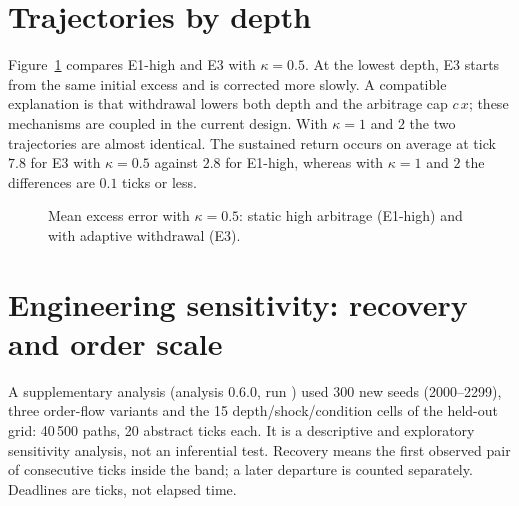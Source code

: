 \section{Trajectories by depth}

Figure~\ref{fig:prof} compares E1-high and E3 with $\kappa=0.5$. At the lowest depth, E3 starts from the same initial excess and is corrected more slowly. A compatible explanation is that withdrawal lowers both depth and the arbitrage cap $c\,x$; these mechanisms are coupled in the current design. With $\kappa=1$ and $2$ the two trajectories are almost identical. The sustained return occurs on average at tick $7.8$ for E3 with $\kappa=0.5$ against $2.8$ for E1-high, whereas with $\kappa=1$ and $2$ the differences are $0.1$ ticks or less.

\begin{figure}[htbp]
\centering
{}
\caption{Mean excess error with $\kappa=0.5$: static high arbitrage (E1-high) and with adaptive withdrawal (E3).}
\label{fig:prof}
\end{figure}

\section{Engineering sensitivity: recovery and order scale}
\label{sec:engineering-sensitivity}

A supplementary analysis (analysis 0.6.0, run \code{\EngineeringRunID}) used 300 new seeds (2000--2299), three order-flow variants and the 15 depth/shock/condition cells of the held-out grid: 40\,500 paths, 20 abstract ticks each. It is a descriptive and exploratory sensitivity analysis, not an inferential test. Recovery means the first observed pair of consecutive ticks inside the band; a later departure is counted separately. Deadlines are ticks, not elapsed time.

